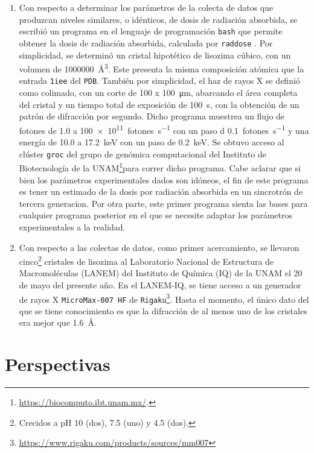 \documentclass[11pt,letterpaper]{article}
\begin{document}
\begin{enumerate}
	\item Con respecto a determinar los parámetros de la colecta de datos que produzcan niveles similares, o idénticos, de dosis de radiación absorbida, se escribió un programa en el lenguaje de programación \verb|bash| que permite obtener la dosis de radiación absorbida,  calculada por \verb|raddose| \cite{Bury2018}. Por simplicidad, se determinó un cristal hipotético de lisozima cúbico, con un volumen de \SI{1000000}{\cubic\angstrom}. Este presenta la misma composición atómica que la entrada \verb|1iee| del \verb|PDB|. También por simplicidad, el haz de rayos X se definió como colimado, con un corte de \num{100} x  \SI{100}{\micro\meter}, abarcando el área completa del cristal y un tiempo total de exposición de \SI{100}{\second}, con la obtención de un patrón de difracción por segundo. Dicho programa muestrea un flujo de fotones de 1.0 a \SI{100e11}{fotones\per\second} con un paso d \SI{0.1}{fotones\per\second} y una energía de 10.0 a \SI{17.2}{\kilo\electronvolt} con un paso de \SI{0.2}{\kilo\electronvolt}. Se obtuvo acceso al clúster \verb|groc| del grupo de genómica computacional del Instituto de Biotecnología de la UNAM\footnote{\url{https://biocomputo.ibt.unam.mx/}.}para correr dicho programa. Cabe aclarar que si bien los parámetros experimentales dados son idóneos, el fin de este programa es tener un estimado de la dosis por radiación absorbida en un sincrotrón de tercera generacion. Por otra parte, este primer programa sienta las bases para cualquier programa posterior en el que se necesite adaptar los parámetros experimentales a la realidad.
	 
	\item Con respecto a las colectas de datos, como primer acercamiento, se llevaron cinco\footnote{Crecidos a pH 10 (dos), 7.5 (uno) y 4.5 (dos).} cristales de lisozima al Laboratorio Nacional de Estructura de Macromoléculas (LANEM) del Instituto de Química (IQ) de la UNAM el 20 de mayo del presente año. En el LANEM-IQ, se tiene acceso a un generador de rayos X \verb|MicroMax-007 HF| de \verb|Rigaku|\footnote{\url{https://www.rigaku.com/products/sources/mm007}}. Hasta el momento, el único dato del que se tiene conocimiento es que la difracción de al menos uno de los cristales era mejor que \SI{1.6}{\angstrom}. 
	\end{enumerate}
	 
 	\section{Perspectivas}
 	
\end{document}
